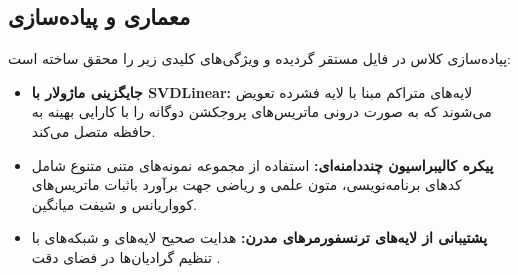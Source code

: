 \subsection{معماری و پیاده‌سازی}
پیاده‌سازی کلاس  در فایل  مستقر گردیده و ویژگی‌های کلیدی زیر را محقق ساخته است:
\begin{itemize}
\item \textbf{جایگزینی ماژولار با SVDLinear:} لایه‌های متراکم مبنا با لایه فشرده  تعویض می‌شوند که به صورت درونی ماتریس‌های پروجکشن دوگانه را با کارایی بهینه به حافظه متصل می‌کند.
\item \textbf{پیکره کالیبراسیون چنددامنه‌ای:} استفاده از مجموعه نمونه‌های متنی متنوع  شامل کدهای برنامه‌نویسی، متون علمی و ریاضی جهت برآورد باثبات ماتریس‌های کوواریانس و شیفت میانگین.
\item \textbf{پشتیبانی از لایه‌های ترنسفورمرهای مدرن:} هدایت صحیح لایه‌های  و شبکه‌های  با تنظیم گرادیان‌ها در فضای دقت .
\end{itemize}
